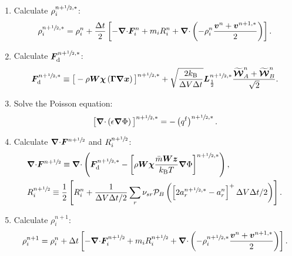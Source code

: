 \documentclass[
10pt
showpacs, showkeys,
amsmath,amssymb,
aps,
pre,
floatfix,
]{revtex4-1}
\newcommand{\divg}{{\V\nabla\cdot}}                       %
\begin{document}
\begin{enumerate}
\item Calculate $\rho^{n+\sfrac{1}{2},*}_i$:
\begin{equation}
\rho^{n+\myhalf,*}_i = \rho^n_i + \frac{\D{t}}{2} \left[ -\divg\V{F}^n_i + m_i R^n_i + \divg\left( -\rho^n_i \frac{\V{v}^n+\V{v}^{n+1,*}}{2} \right) \right].
\end{equation}

\item Calculate $\boldsymbol{F}_\mathrm{d}^{n+\sfrac{1}{2},*}$:
\begin{equation}
\boldsymbol{F}_\mathrm{d}^{n+\sfrac{1}{2},*} \equiv \big[-\rho\boldsymbol{W}\boldsymbol{\chi}\left(\boldsymbol{\Gamma}\boldsymbol{\nabla}\boldsymbol{x}\right)\big]^{n+\sfrac{1}{2},*} +
\sqrt{ \frac{2k_\mathrm{B}}{\Delta V\Delta t} } \boldsymbol{L}^{n+\sfrac{1}{2},*}_{\frac12} \frac{\widetilde{\boldsymbol{\mathcal{W}}}_A^n+\widetilde{\boldsymbol{\mathcal{W}}}_B^n}{\sqrt{2}}.
\end{equation}

\item Solve the Poisson equation:
\begin{equation}
\big[\divg\left(\epsilon\grad\Phi\right)\big]^{n+\myhalf,*} = - \left(q^\mathrm{f}\right)^{n+\myhalf,*}.
\end{equation}

\item Calculate $\divg\V{F}^{n+\myhalf}$ and $R^{n+\sfrac{1}{2}}_i$:
\begin{align}
&\divg\V{F}^{n+\myhalf} \equiv \divg\left(\V{F}_\mathrm{d}^{n+\myhalf,*} - \left[\rho\V{W}\V{\chi}\frac{\bar{m}\M{W}\V{z}}{k_\mathrm{B}T}\grad\Phi\right]^{n+\myhalf,*}\right),
\\
&R^{n+\myhalf}_i \equiv \frac{1}{2}\left[ R_i^n + \frac{1}{\D{V}\D{t}/2} \sum_r \nu_{sr} \mathcal{P}_B\left( \left[ 2 a^{n+\myhalf,*}_r - a^n_r \right]^+ \D{V}\D{t}/2 \right) \right].
\end{align}

\item Calculate $\rho^{n+1}_i$:
\begin{equation}
\rho^{n+1}_i = \rho^n_i + \D{t} \left[ -\divg\V{F}^{n+\myhalf}_i + m_i R^{n+\myhalf}_i 
+ \divg\left( -\rho^{n+\myhalf,*}_i \frac{\V{v}^n + \V{v}^{n+1,*}}{2} \right) \right].
\end{equation} 


\end{enumerate}
\end{document}
